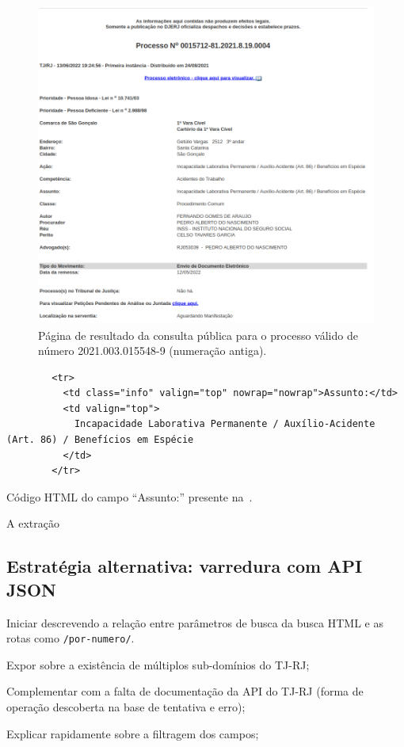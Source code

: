 \begin{figure}[H]
    \centering{}
    \includegraphics{img/exemplo-resultado-consulta-publica-1.png}
    \caption{%
        Página de resultado da consulta pública para o processo válido de
        número 2021.003.015548-9 (numeração
        antiga).\label{fig:exemplo-pagina-ww4}
    }
\end{figure}

\begin{listing}
    \centering{}
    \begin{verbatim}
        <tr>
          <td class="info" valign="top" nowrap="nowrap">Assunto:</td>
          <td valign="top">
            Incapacidade Laborativa Permanente / Auxílio-Acidente (Art. 86) / Benefícios em Espécie
          </td>
        </tr>
    \end{verbatim}
    \caption{Código HTML do campo ``Assunto:'' presente na~.\label{cod:html-assunto}}
\end{listing}

A extração

\subsection{Estratégia alternativa: varredura com API JSON}

\begin{todolist}
    \item Iniciar descrevendo a relação entre parâmetros de busca da busca HTML
          e as rotas como \texttt{/por-numero/}.
    \item Expor sobre a existência de múltiplos sub-domínios do TJ-RJ;
    \item Complementar com a falta de documentação da API do TJ-RJ (forma de
          operação descoberta na base de tentativa e erro);
    \item Explicar rapidamente sobre a filtragem dos campos;
\end{todolist}

